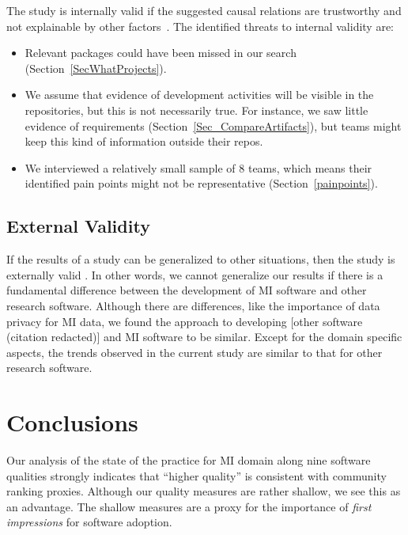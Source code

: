 \documentclass[doubleblind,12pt, 3p, times]{elsarticle}
\begin{document}
The study is internally valid if the suggested causal relations are trustworthy
and not explainable by other factors~\cite{RunesonAndHost2009}. The identified threats to internal validity are:

\begin{itemize}
\item Relevant packages could have been missed in our search
(Section~\ref{SecWhatProjects}).
\item We assume that evidence of development activities
will be visible in the repositories, but this is not necessarily true. For
instance, we saw little evidence of requirements
(Section~\ref{Sec_CompareArtifacts}), but teams might keep this kind of
information outside their repos.
\item We interviewed a relatively small sample of 8 teams, which means their
identified pain points might not be representative (Section~\ref{painpoints}).
\end{itemize}

\subsection{External Validity}

If the results of a study can be generalized to other situations, then the study
is externally valid \cite{RunesonAndHost2009}.  In other words, we cannot
generalize our results if there is a fundamental difference between the
development of MI software and other research software.  Although there are
differences, like the importance of data privacy for MI data, we found the
approach to developing [other software (citation redacted)]
and MI software to be similar.  Except for
the domain specific aspects, the trends observed in the current study are
similar to that for other research software.

\section{Conclusions} \label{ch_conclusions}

Our analysis of the state of the practice for MI domain along nine software
qualities strongly indicates that ``higher quality'' is consistent with
community ranking proxies. Although our quality measures are rather shallow, we
see this as an advantage. The shallow measures are a proxy for the importance of
\emph{first impressions} for software adoption.
\end{document}

